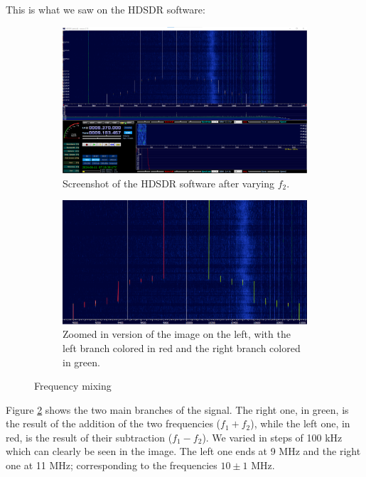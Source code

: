\documentclass{article}
\begin{document}
This is what we saw on the HDSDR software:

\begin{figure}[h]
	\centering
	\begin{subfigure}[t]{0.45\textwidth}
		\includegraphics[width=\textwidth]{Figures/Task 1/Mixing.png}
		\caption{Screenshot of the HDSDR software after varying $f_2$.}
		\label{fig:mixing}
	\end{subfigure}
	\hspace{0.5cm}
	\begin{subfigure}[t]{0.45\textwidth}
		\includegraphics[width=\textwidth]{Figures/Task 1/MixingColored.png}
		\caption{Zoomed in version of the image on the left, with the left branch colored in red and the right branch colored in green.}
		\label{fig:mixing_colored}
	\end{subfigure}
	\caption{Frequency mixing}
	\label{fig:mixing_all}
\end{figure}

Figure \ref{fig:mixing_colored} shows the two main branches of the signal. The right one, in green, is the result of the addition of the two frequencies ($f_1+f_2$), while the left one, in red, is the result of their subtraction ($f_1-f_2$). 
We varied in steps of 100 kHz which can clearly be seen in the image. The left one ends at 9 MHz and the right one at 11 MHz; corresponding to the frequencies $ 10 \pm 1 $ MHz. 
\end{document}
